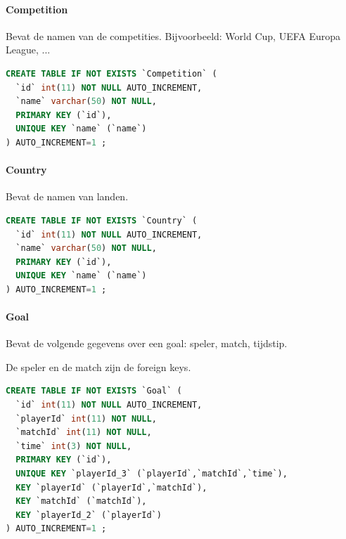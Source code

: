 \documentclass[11pt]{article}
\begin{document}
        
        
    \paragraph{Competition}
        Bevat de namen van de competities.
        Bijvoorbeeld: World Cup, UEFA Europa League, ...
        
        \begin{framed}
        \begin{lstlisting}[language=sql]
CREATE TABLE IF NOT EXISTS `Competition` (
  `id` int(11) NOT NULL AUTO_INCREMENT,
  `name` varchar(50) NOT NULL,
  PRIMARY KEY (`id`),
  UNIQUE KEY `name` (`name`)
) AUTO_INCREMENT=1 ;
        \end{lstlisting}
        \end{framed}
        
        
        
        
    \paragraph{Country}
        Bevat de namen van landen.
        
        \begin{framed}
        \begin{lstlisting}[language=sql]
CREATE TABLE IF NOT EXISTS `Country` (
  `id` int(11) NOT NULL AUTO_INCREMENT,
  `name` varchar(50) NOT NULL,
  PRIMARY KEY (`id`),
  UNIQUE KEY `name` (`name`)
) AUTO_INCREMENT=1 ;
        \end{lstlisting}
        \end{framed}
        
        
        
        
    \paragraph{Goal}
        Bevat de volgende gegevens over een goal:
            speler, match, tijdstip.
            
        De speler en de match zijn de foreign keys.
        
        \begin{framed}
        \begin{lstlisting}[language=sql]
CREATE TABLE IF NOT EXISTS `Goal` (
  `id` int(11) NOT NULL AUTO_INCREMENT,
  `playerId` int(11) NOT NULL,
  `matchId` int(11) NOT NULL,
  `time` int(3) NOT NULL,
  PRIMARY KEY (`id`),
  UNIQUE KEY `playerId_3` (`playerId`,`matchId`,`time`),
  KEY `playerId` (`playerId`,`matchId`),
  KEY `matchId` (`matchId`),
  KEY `playerId_2` (`playerId`)
) AUTO_INCREMENT=1 ;
        \end{lstlisting}
        \end{framed}
        
\end{document}
